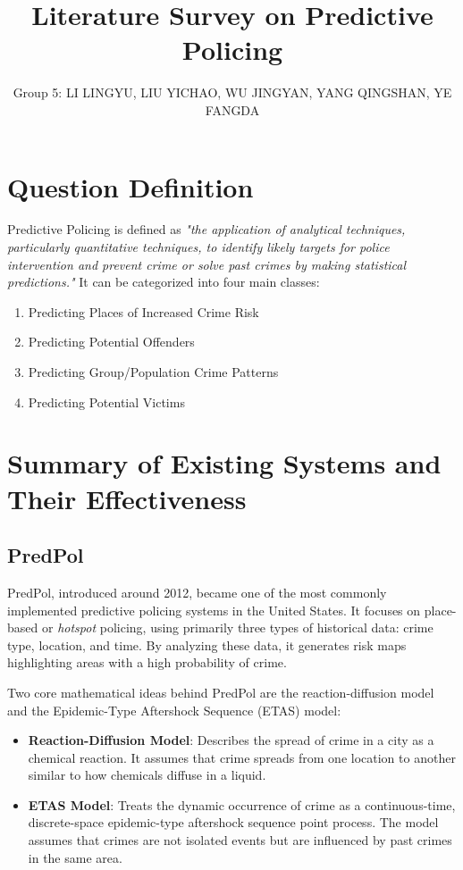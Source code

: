 \documentclass{article}
\title{Literature Survey on Predictive Policing}
\author{\small{Group 5: LI LINGYU, LIU YICHAO, WU JINGYAN, YANG QINGSHAN, YE FANGDA}}
\date{}
\begin{document}
\maketitle

\section{Question Definition}

Predictive Policing is defined as \textit{"the application of analytical techniques, particularly quantitative techniques, to identify likely targets for police intervention and prevent crime or solve past crimes by making statistical predictions."} It can be categorized into four main classes:
\begin{enumerate}
    \item Predicting Places of Increased Crime Risk
    \item Predicting Potential Offenders
    \item Predicting Group/Population Crime Patterns
    \item Predicting Potential Victims
\end{enumerate}

\section{Summary of Existing Systems and Their Effectiveness}

\subsection{PredPol}
PredPol, introduced around 2012, became one of the most commonly implemented predictive policing systems in the United States. It focuses on place-based or \textit{hotspot} policing, using primarily three types of historical data: crime type, location, and time. By analyzing these data, it generates risk maps highlighting areas with a high probability of crime.

Two core mathematical ideas behind PredPol are the reaction-diffusion model and the Epidemic-Type Aftershock Sequence (ETAS) model:
\begin{itemize}
    \item \textbf{Reaction-Diffusion Model}: Describes the spread of crime in a city as a chemical reaction. It assumes that crime spreads from one location to another similar to how chemicals diffuse in a liquid.
    \item \textbf{ETAS Model}: Treats the dynamic occurrence of crime as a continuous-time, discrete-space epidemic-type aftershock sequence point process. The model assumes that crimes are not isolated events but are influenced by past crimes in the same area.
\end{itemize}
\end{document}
